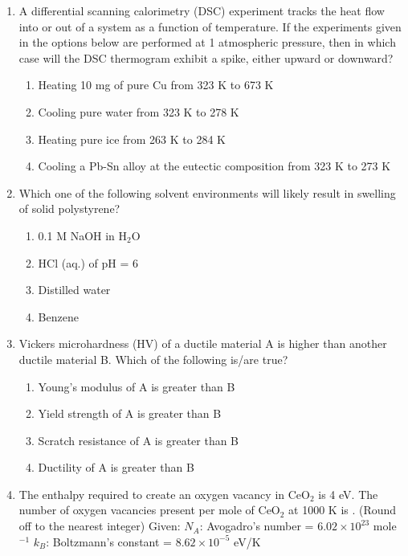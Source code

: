 \documentclass[a4paper,10pt]{article}
\begin{document}
\begin{enumerate}
\item A differential scanning calorimetry (DSC) experiment tracks the heat flow into or out of a system as a function of temperature. If the experiments given in the options below are performed at 1 atmospheric pressure, then in which case will the DSC thermogram exhibit a spike, either upward or downward?

\hfill{}
\begin{enumerate}
    \item Heating 10 mg of pure Cu from 323 K to 673 K
    \item Cooling pure water from 323 K to 278 K
    \item Heating pure ice from 263 K to 284 K
    \item Cooling a Pb-Sn alloy at the eutectic composition from 323 K to 273 K
\end{enumerate}

\item Which one of the following solvent environments will likely result in swelling of solid polystyrene?

\hfill{}
\begin{enumerate}
    \item 0.1 M NaOH in H$_2$O
    \item HCl (aq.) of pH = 6
    \item Distilled water
    \item Benzene
\end{enumerate}

\item Vickers microhardness (HV) of a ductile material A is higher than another ductile material B. Which of the following is/are true?

\hfill{}
\begin{enumerate}
    \item Young's modulus of A is greater than B
    \item Yield strength of A is greater than B
    \item Scratch resistance of A is greater than B
    \item Ductility of A is greater than B
\end{enumerate}

\item The enthalpy required to create an oxygen vacancy in CeO$_2$ is 4 eV. The number of oxygen vacancies present per mole of CeO$_2$ at 1000 K is \underline{\hspace{2cm}}.
(Round off to the nearest integer)
Given:
$N_A$: Avogadro's number = $6.02 \times 10^{23}$ mole$^{-1}$
$k_B$: Boltzmann's constant = $8.62 \times 10^{-5}$ eV/K


\end{enumerate}
\end{document}
